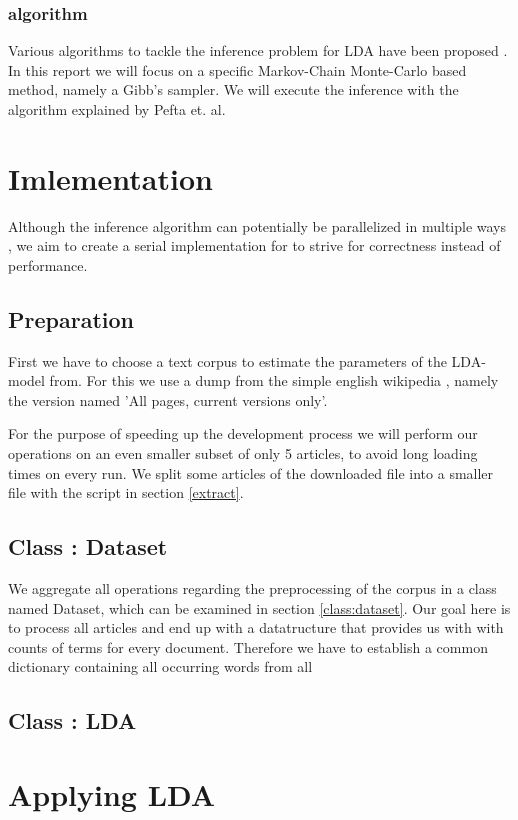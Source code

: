 \documentclass[12pt,landscape,twopage]{article}
\begin{document}
\subsubsection{algorithm}
Various algorithms to tackle the inference problem for LDA have been proposed \cite{Blei2003}. In this report we will focus on a specific Markov-Chain Monte-Carlo based method, namely a Gibb's sampler. We will execute the inference with the algorithm explained by Pefta et. al.
\section{Imlementation}
Although the inference algorithm can potentially be parallelized in multiple ways \cite{Newman2006ScalablePT,Wang2009PLDAPL}, we aim to create a serial implementation for to strive for correctness instead of performance.
\subsection{Preparation}
First we have to choose a text corpus to estimate the parameters of the LDA-model from. For this we use a dump from the simple english wikipedia \cite{simplewi84:online}, namely the version named 'All pages, current versions only'.

For the purpose of speeding up the development process we will perform our operations on an even smaller subset of only 5 articles, to avoid long loading times on every run. We split some articles of the downloaded file into a smaller file with the script in section \ref{extract}.

\subsection{Class : Dataset}
We aggregate all operations regarding the preprocessing of the corpus in a class named Dataset, which can be examined in section  \ref{class:dataset}. Our goal here is to process all articles and end up with a datatructure that provides us with with counts of terms for every document. Therefore we have to establish a common dictionary containing all occurring words from all

\subsection{Class : LDA}

\section{Applying LDA}
\newpage
\end{document}

